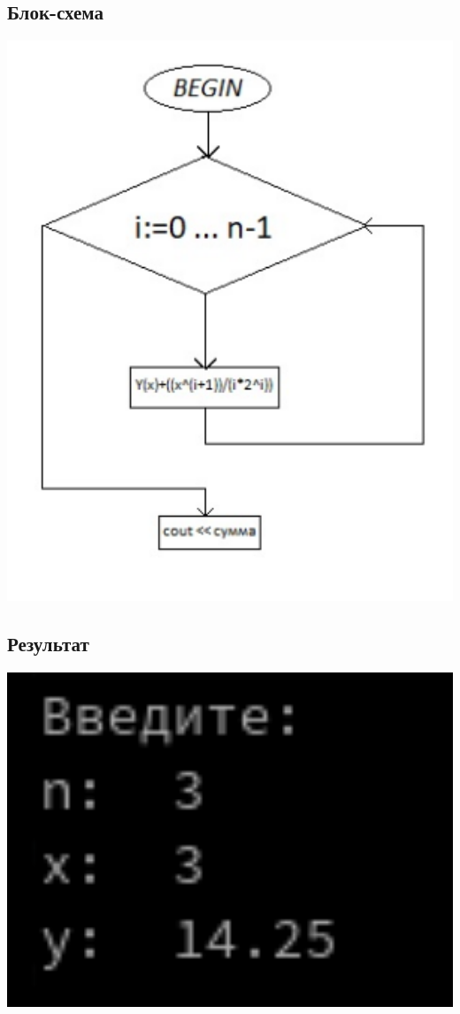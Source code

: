 \documentclass[a4paper]{article}
\begin{document}
\subsection{Блок-схема}
\includegraphics[width=1\textwidth]{block5.png}
\subsection{Результат}
\includegraphics[width=1\textwidth]{5.png}
\end{document}

